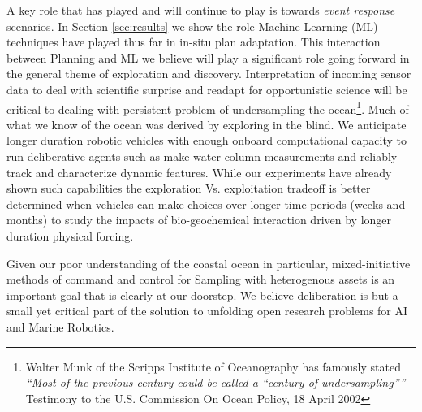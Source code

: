 A key role that \rx has played and will continue to play is towards
\emph{event response} scenarios. In Section \ref{sec:results} we show
the role Machine Learning (ML) techniques have played thus far in
in-situ plan adaptation. This interaction between Planning and ML we
believe will play a significant role going forward in the general
theme of exploration and discovery. Interpretation of incoming sensor
data to deal with scientific surprise and readapt for opportunistic
science will be critical to dealing with persistent problem of
undersampling the ocean\footnote{Walter Munk of the Scripps Institute
  of Oceanography has famously stated \emph{``Most of the previous
    century could be called a “century of undersampling”''} --
  Testimony to the U.S. Commission On Ocean Policy, 18 April
  2002}. Much of what we know of the ocean was derived by exploring in
the blind. We anticipate longer duration robotic vehicles with enough
onboard computational capacity to run deliberative agents such as \rx
make water-column measurements and reliably track and characterize
dynamic features. While our experiments have already shown such
capabilities the exploration Vs. exploitation tradeoff is better
determined when vehicles can make choices over longer time periods
(weeks and months) to study the impacts of bio-geochemical interaction
driven by longer duration physical forcing.

Given our poor understanding of the coastal ocean in particular,
mixed-initiative methods of command and control for Sampling with
heterogenous assets is an important goal that is clearly at our
doorstep. We believe deliberation is but a small yet critical part of
the solution to unfolding open research problems for AI and Marine
Robotics.
